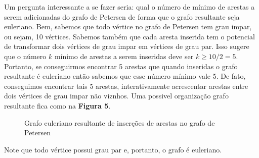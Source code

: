 \documentclass[11pt,a4paper]{exam}
\begin{document}
    Um pergunta interessante a se fazer seria: qual o número de mínimo
    de arestas a serem adicionadas do grafo de Petersen de forma que o
    grafo resultante seja euleriano. Bem, sabemos que todo vértice no
    grafo de Petersen tem grau impar, ou sejam, 10 vértices. Sabemos
    também que cada aresta
    inserida tem o potencial de transformar dois vértices de grau impar
    em vértices de grau par. Isso sugere que o número $k$ mínimo de arestas
    a serem inseridas deve ser $k\geq 10/2 = 5$. Portanto, se
    conseguirmos encontrar 5 arestas que quando inseridas o grafo
    resultante é euleriano então sabemos que esse número mínimo vale 5.
    De fato, conseguimos encontrar tais 5 arestas, interativamente
    acrescentar arestas entre dois vértices de grau impar não viznhos.
    Uma possivel organização  grafo resultante fica como na \textbf{Figura 5}.
\begin{figure}[H]
    \centering
    \caption{Grafo euleriano resultante de inserções de arestas no grafo
    de Petersen}
\end{figure}
    Note que todo vértice possui grau par e, portanto, o grafo é euleriano.
\end{document}
